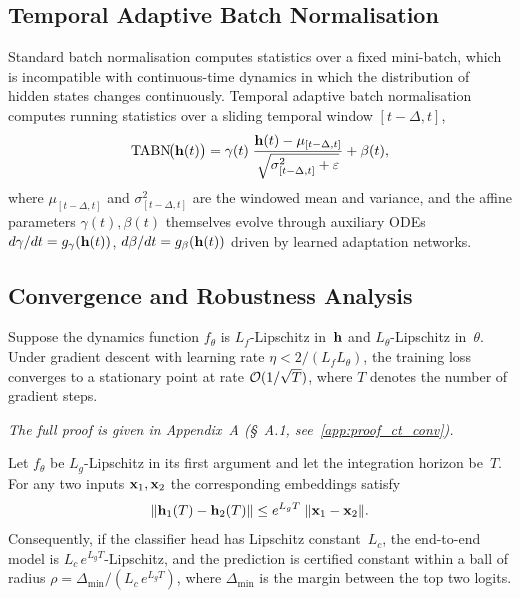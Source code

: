 \subsection{Temporal Adaptive Batch Normalisation}

Standard batch normalisation computes statistics over a fixed mini-batch, which is incompatible with continuous-time dynamics in which the distribution of hidden states changes continuously. Temporal adaptive batch normalisation computes running statistics over a sliding temporal window $[t-\Delta,t]$,
\begin{equation}
\mathrm{TABN}\!\bigl(\mathbf{h}(t)\bigr)
= \gamma(t)\;\frac{\mathbf{h}(t)-\mu_{[t-\Delta,t]}}
  {\sqrt{\sigma^2_{[t-\Delta,t]}+\varepsilon}}
+ \beta(t),
\label{eq:tabn}
\end{equation}
where $\mu_{[t-\Delta,t]}$ and $\sigma^2_{[t-\Delta,t]}$ are the windowed mean and variance, and the affine parameters $\gamma(t),\beta(t)$ themselves evolve through auxiliary ODEs $d\gamma/dt=g_\gamma(\mathbf{h}(t))$, $d\beta/dt=g_\beta(\mathbf{h}(t))$ driven by learned adaptation networks.

\subsection{Convergence and Robustness Analysis}

\begin{theorem}
\label{thm:ct_tgnn_conv}
Suppose the dynamics function $f_\theta$ is $L_f$-Lipschitz in~$\mathbf{h}$ and $L_\theta$-Lipschitz in~$\theta$. Under gradient descent with learning rate $\eta<2/(L_f L_\theta)$, the training loss converges to a stationary point at rate $\mathcal{O}(1/\sqrt{T})$, where $T$ denotes the number of gradient steps.
\end{theorem}

\noindent\textit{The full proof is given in Appendix~A (\S~A.1, see~\ref{app:proof_ct_conv}).}

\begin{theorem}
\label{thm:ct_tgnn_rob}
Let $f_\theta$ be $L_g$-Lipschitz in its first argument and let the integration horizon be~$T$. For any two inputs $\mathbf{x}_1,\mathbf{x}_2$ the corresponding embeddings satisfy
\begin{equation}
\|\mathbf{h}_1(T)-\mathbf{h}_2(T)\|
\le e^{L_g T}\;\|\mathbf{x}_1-\mathbf{x}_2\|.
\label{eq:lip_cert}
\end{equation}
Consequently, if the classifier head has Lipschitz constant~$L_c$, the end-to-end model is $L_c\,e^{L_g T}$-Lipschitz, and the prediction is certified constant within a ball of radius $\rho = \Delta_{\min}/(L_c\,e^{L_g T})$, where $\Delta_{\min}$ is the margin between the top two logits.
\end{theorem}

